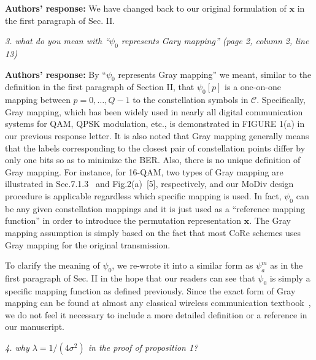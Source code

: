 \documentclass[onecolumn, 11pt, draftclsnofoot]{IEEEtran}
\begin{document}
\noindent \textbf{Authors' response:}
We have changed back to our original formulation of $\mathbf{x}$ in the first
paragraph of Sec. II.

\vspace{0.5cm}

\noindent
\emph{3. what do you mean with ``$\psi_0$ represents Gary mapping'' (page 2,
column 2, line 13)}

\noindent \textbf{Authors' response:}
By ``$\psi_0$ represents Gray mapping'' we meant, similar to the definition in
the first paragraph of Section II, that $\psi_0[p]$ is a one-on-one mapping
between $p=0,\ldots,Q-1$ to the constellation symbols in $\mathcal{C}$.
Specifically, Gray mapping, which has been widely used in nearly all digital
communication systems for QAM, QPSK modulation, etc., is demonstrated in FIGURE
1(a) in our previous response letter. It is also noted that Gray mapping
generally means that the labels corresponding to the closest pair of
constellation points differ by only one bits so as to minimize the BER. Also,
there is no unique definition of Gray mapping. For instance, for 16-QAM, two
types of Gray mapping are illustrated in Sec.7.1.3~\citep[R][]{TS36.211} and
Fig.2(a)~[5], respectively, and our MoDiv design procedure is applicable
regardless which specific mapping is used. In fact, $\psi_0$ can be any given
constellation mappings and it is just used as a ``reference mapping function''
in order to introduce the permutation representation $\mathbf{x}$.
The Gray mapping assumption is simply based on the fact that most CoRe schemes
uses Gray mapping for the original transmission.

To clarify the meaning of $\psi_0$, we re-wrote it into a similar form as
$\psi_a^{m}$ as in the first paragraph of Sec. II in the hope that our readers
can see that $\psi_0$ is simply a specific mapping function as defined
previously.
Since the exact form of Gray mapping can be found at almost any classical
wireless communication
textbook~\citep[R][]{proakisdigital,molisch2007wireless,goldsmith2005wireless},
we do not feel it necessary to include a more detailed definition or a reference in our manuscript.



\vspace{0.5cm}

\noindent
\emph{4. why $\lambda = 1/(4\sigma^2)$ in the proof of proposition 1?}
\end{document}
